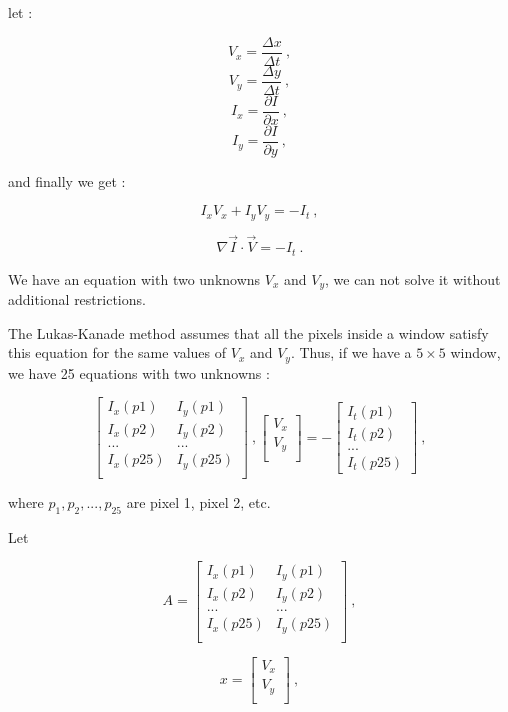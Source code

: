 \noindent let :

$$ V_x = \frac{\Delta x}{\Delta t}\ , $$
$$ V_y = \frac{\Delta y}{\Delta t}\ , $$
$$ I_x = \frac{\partial I}{\partial x}\ ,$$
$$ I_y = \frac{\partial I}{\partial y}\ ,$$

\noindent and finally we get :

$$ I_x V_x + I_y V_y = -I_t \ ,$$

\begin{equation}
\label{eq:oflowgeneral}
\nabla{\vec{I}} \cdot \vec{V} = -I_t \ .
\end{equation}

We have an equation with two unknowns $V_x$ and $V_y$, we can not solve it without additional restrictions.

The Lukas-Kanade method assumes that all the pixels inside a window satisfy this equation for the same 
values of $V_x$ and $V_y$. Thus, if we have a $5\times5$ window, we have 25 equations with two unknowns :

$$
\begin{bmatrix}
I_x(p1) & I_y(p1) \\
I_x(p2) & I_y(p2) \\
... & ... \\
I_x(p25) & I_y(p25)\\
\end{bmatrix}  \ ,
\begin{bmatrix}
V_x \\
V_y\\
\end{bmatrix}
=
-\begin{bmatrix}
I_t(p1) \\
I_t(p2) \\
...     \\
I_t(p25) 
\end{bmatrix} \ ,
$$

where $p_1, p_2, ..., p_{25}$ are pixel 1, pixel 2, etc.

Let 

$$
A = 
\begin{bmatrix}
I_x(p1) & I_y(p1) \\
I_x(p2) & I_y(p2) \\
... & ... \\
I_x(p25) & I_y(p25)\\
\end{bmatrix}  \ ,
$$

$$
x=
\begin{bmatrix}
V_x \\
V_y\\
\end{bmatrix} \ ,
$$

